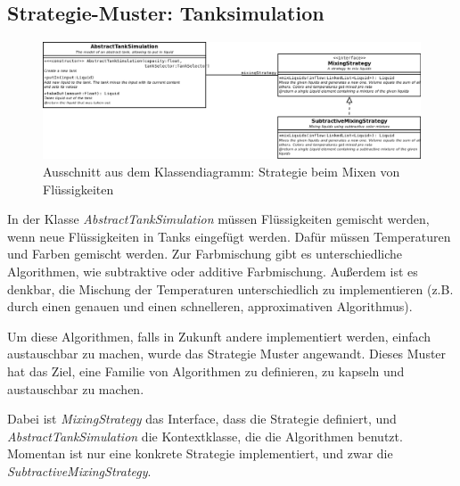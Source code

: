 \documentclass[parskip=full]{scrartcl}
\begin{document}
\subsection{Strategie-Muster: Tanksimulation}
\begin{figure}[H]
  \centering
  \includegraphics[scale=0.35]{design/pattern-screenshots/strategy-MixingStrategy.png}
  \caption{Ausschnitt aus dem Klassendiagramm: Strategie beim Mixen von Flüssigkeiten}
\end{figure}
In der Klasse \emph{AbstractTankSimulation} müssen Flüssigkeiten gemischt werden, wenn neue Flüssigkeiten in Tanks eingefügt werden.
Dafür müssen Temperaturen und Farben gemischt werden. Zur Farbmischung gibt es unterschiedliche Algorithmen, wie subtraktive oder additive
Farbmischung. Außerdem ist es denkbar, die Mischung der Temperaturen unterschiedlich zu implementieren (z.B. durch einen genauen und einen schnelleren,
approximativen Algorithmus).

Um diese Algorithmen, falls in Zukunft andere implementiert werden, einfach austauschbar zu machen, wurde
das Strategie Muster angewandt. Dieses Muster hat das Ziel, eine Familie von Algorithmen zu definieren, zu kapseln und austauschbar zu machen.

Dabei ist \emph{MixingStrategy} das Interface, dass die Strategie definiert, und \emph{AbstractTankSimulation} die Kontextklasse, die die Algorithmen
benutzt. Momentan ist nur eine konkrete Strategie implementiert, und zwar die \emph{SubtractiveMixingStrategy}.

\pagebreak
\end{document}
